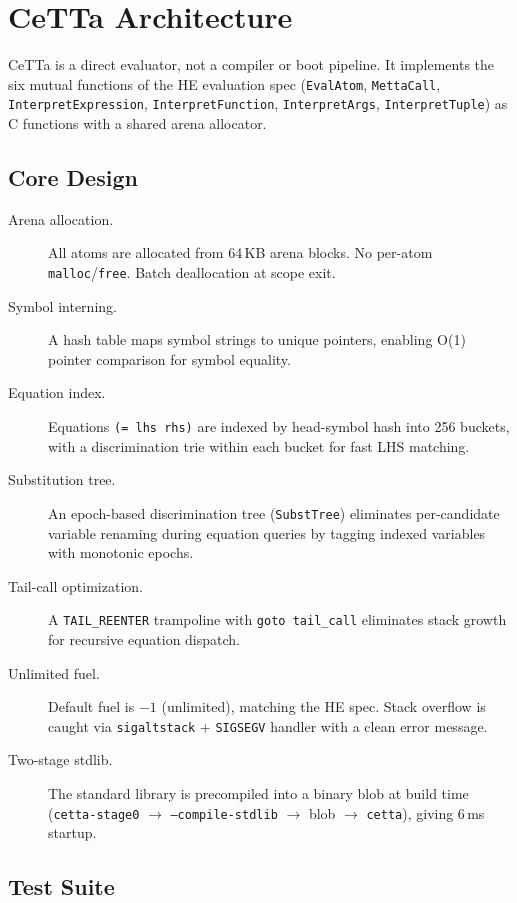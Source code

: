\documentclass[11pt]{article}
\newcommand{\code}[1]{\texttt{#1}}
\newcommand{\HE}{\textup{HE}}
\newcommand{\CeTTa}{\textup{CeTTa}}
\begin{document}
\section{\CeTTa{} Architecture}

\CeTTa{} is a direct evaluator, not a compiler or boot pipeline.  It
implements the six mutual functions of the \HE{} evaluation spec
(\code{EvalAtom}, \code{MettaCall}, \code{InterpretExpression},
\code{InterpretFunction}, \code{InterpretArgs}, \code{InterpretTuple})
as C functions with a shared arena allocator.

\subsection{Core Design}

\begin{description}
\item[Arena allocation.] All atoms are allocated from 64\,KB arena blocks.
  No per-atom \code{malloc}/\code{free}.  Batch deallocation at scope exit.
\item[Symbol interning.] A hash table maps symbol strings to unique
  pointers, enabling O(1) pointer comparison for symbol equality.
\item[Equation index.] Equations \code{(= lhs rhs)} are indexed by
  head-symbol hash into 256 buckets, with a discrimination trie within
  each bucket for fast LHS matching.
\item[Substitution tree.] An epoch-based discrimination tree
  (\code{SubstTree}) eliminates per-candidate variable renaming during
  equation queries by tagging indexed variables with monotonic epochs.
\item[Tail-call optimization.] A \code{TAIL\_REENTER} trampoline with
  \code{goto tail\_call} eliminates stack growth for recursive equation
  dispatch.
\item[Unlimited fuel.] Default fuel is $-1$ (unlimited), matching the
  \HE{} spec.  Stack overflow is caught via \code{sigaltstack} +
  \code{SIGSEGV} handler with a clean error message.
\item[Two-stage stdlib.] The standard library is precompiled into a
  binary blob at build time (\code{cetta-stage0} $\to$
  \code{--compile-stdlib} $\to$ blob $\to$ \code{cetta}), giving 6\,ms
  startup.
\end{description}

\subsection{Test Suite}
\end{document}
